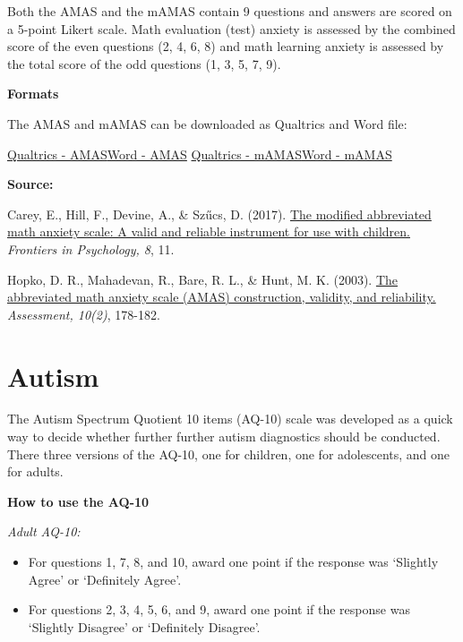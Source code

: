 \documentclass[
]{book}
\providecommand{\tightlist}{%
  \setlength{\itemsep}{0pt}\setlength{\parskip}{0pt}}
\begin{document}
Both the AMAS and the mAMAS contain 9 questions and answers are scored on a 5-point Likert scale. Math evaluation (test) anxiety is assessed by the combined score of the even questions (2, 4, 6, 8) and math learning anxiety is assessed by the total score of the odd questions (1, 3, 5, 7, 9).

\textbf{Formats}

The AMAS and mAMAS can be downloaded as Qualtrics and Word file:

\href{link}{Qualtrics - AMAS}\textbar{}\href{link}{Word - AMAS}
\href{link}{Qualtrics - mAMAS}\textbar{}\href{link}{Word - mAMAS}

\textbf{Source:}

Carey, E., Hill, F., Devine, A., \& Szűcs, D. (2017). \href{https://www.frontiersin.org/articles/10.3389/fpsyg.2017.00011/full}{The modified abbreviated math anxiety scale: A valid and reliable instrument for use with children.} \emph{Frontiers in Psychology, 8}, 11.

Hopko, D. R., Mahadevan, R., Bare, R. L., \& Hunt, M. K. (2003). \href{https://www.researchgate.net/profile/Stephen_Joy/post/Hello_Can_anyone_tell_me_how_to_access_the_Abbreviated_Math_Anxiety_Scale_developed_by_Derek_Hopko2/attachment/59d624eb79197b80779833c8/AS:315374518636545@1452202552608/download/Math+Anxiety+Scale+Abbreviated+2003.pdf}{The abbreviated math anxiety scale (AMAS) construction, validity, and reliability.} \emph{Assessment, 10(2)}, 178-182.

\hypertarget{autism}{%
\section{Autism}\label{autism}}

The Autism Spectrum Quotient 10 items (AQ-10) scale was developed as a quick way to decide whether further further autism diagnostics should be conducted. There three versions of the AQ-10, one for children, one for adolescents, and one for adults.

\textbf{How to use the AQ-10}

\emph{Adult AQ-10:}

\begin{itemize}
\tightlist
\item
  For questions 1, 7, 8, and 10, award one point if the response was `Slightly Agree' or `Definitely Agree'.
\item
  For questions 2, 3, 4, 5, 6, and 9, award one point if the response was `Slightly Disagree' or `Definitely Disagree'.
\end{itemize}
\end{document}
